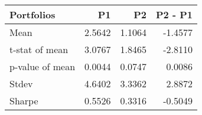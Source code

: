\begin{tabular}{lrrr}
\toprule
Portfolios & P1 & P2 & P2 - P1 \\
\midrule
Mean & 2.5642 & 1.1064 & -1.4577 \\
t-stat of mean & 3.0767 & 1.8465 & -2.8110 \\
p-value of mean & 0.0044 & 0.0747 & 0.0086 \\
Stdev & 4.6402 & 3.3362 & 2.8872 \\
Sharpe & 0.5526 & 0.3316 & -0.5049 \\
\bottomrule
\end{tabular}
